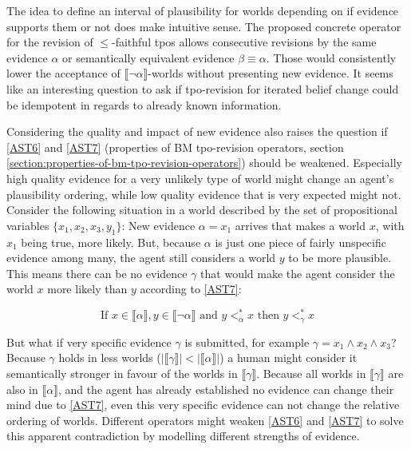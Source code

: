 \documentclass[english, 12pt]{scrartcl}
\theoremstyle{definition}
\theoremstyle{definition}
\theoremstyle{definition}
\newcommand{\modelsOf}[1]{\llbracket #1 \rrbracket}
\begin{document}
The idea to define an interval of plausibility for worlds depending on if evidence supports them or not does make intuitive sense. The proposed concrete operator for the revision of $\leq$-faithful tpos allows consecutive revisions by the same evidence $\alpha$ or semantically equivalent evidence $\beta \equiv \alpha$. Those would consistently lower the acceptance of $\modelsOf{\neg\alpha}$-worlds without presenting new evidence. It seems like an interesting question to ask if tpo-revision for iterated belief change could be idempotent in regards to already known information.

Considering the quality and impact of new evidence also raises the question if \ref{AST6} and \ref{AST7} (properties of BM tpo-revision operators, section \ref{section:properties-of-bm-tpo-revision-operators}) should be weakened. Especially high quality evidence for a very unlikely type of world might change an agent's plausibility ordering, while low quality evidence that is very expected might not.
Consider the following situation in a world described by the set of propositional variables $\{x_1, x_2, x_3, y_1\}$: New evidence $\alpha = x_1$ arrives that  makes a world $x$, with $x_1$ being true, more likely. But, because $\alpha$ is just one piece of fairly unspecific evidence among many, the agent still considers a world $y$ to be more plausible. This means there can be no evidence $\gamma$ that would make the agent consider the world $x$ more likely than $y$ according to \ref{AST7}:

\begin{equation*}
    \textrm{If } x \in \modelsOf{\alpha}, y \in \modelsOf{\neg\alpha} \textrm{ and } y <_{\alpha}^{\ast} x \textrm{ then } y <_{\gamma}^{\ast} x
\end{equation*}

But what if very specific evidence $\gamma$ is submitted, for example $\gamma = x_1 \wedge x_2 \wedge x_3$? Because $\gamma$ holds in less worlds ($|\modelsOf{\gamma}| <  |\modelsOf{\alpha}|$) a human might consider it semantically stronger in favour of the worlds in $\modelsOf{\gamma}$. Because all worlds in $\modelsOf{\gamma}$ are also in $\modelsOf{\alpha}$, and the agent has already established no evidence can change their mind due to \ref{AST7}, even this very specific evidence can not change the relative ordering of worlds. Different operators might weaken \ref{AST6} and \ref{AST7} to solve this apparent contradiction by modelling different strengths of evidence.

\newpage

\typeout{}


\end{document}
